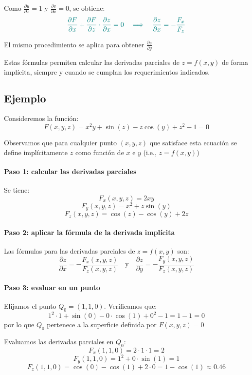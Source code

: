 \documentclass{article}
\begin{document}
Como \( \frac{\partial u}{\partial x} = 1 \) y \( \frac{\partial v}{\partial x} = 0 \), se obtiene:
\[
\color{teal}
\frac{\partial F}{\partial x} + \frac{\partial F}{\partial z} \cdot \frac{\partial z}{\partial x} = 0 \quad \Longrightarrow \quad \frac{\partial z}{\partial x} = -\frac{F_x}{F_z}
\]

El mismo procedimiento se aplica para obtener \( \frac{\partial z}{\partial y} \)

Estas fórmulas permiten calcular las derivadas parciales de \( z = f(x,y) \) de forma implícita, siempre y cuando se cumplan los requerimientos indicados.
\subsection*{Ejemplo}

Consideremos la función:
\[
F(x,y,z) = x^2y + \sin(z) - z\cos(y) + z^2 - 1 = 0
\]

Observamos que para cualquier punto \((x,y,z)\) que satisface esta ecuación se define implícitamente \( z \) como función de \( x \) e \( y \) (i.e., \( z = f(x,y) \))

\paragraph{\color{teal}Paso 1: calcular las derivadas parciales}  
Se tiene:
\[
F_x(x,y,z) = 2xy
\]
\[
F_y(x,y,z) = x^2 + z\sin(y)
\]
\[
F_z(x,y,z) = \cos(z) - \cos(y) + 2z
\]

\paragraph{\color{teal}Paso 2: aplicar la fórmula de la derivada implícita}  
Las fórmulas para las derivadas parciales de \( z = f(x,y) \) son:
\[
\frac{\partial z}{\partial x} = -\frac{F_x(x,y,z)}{F_z(x,y,z)} \quad \text{y} \quad \frac{\partial z}{\partial y} = -\frac{F_y(x,y,z)}{F_z(x,y,z)}
\]

\paragraph{\color{teal}Paso 3: evaluar en un punto}  
Elijamos el punto \( Q_0 = (1,1,0) \). Verificamos que:
\[
1^2 \cdot 1 + \sin(0) - 0 \cdot \cos(1) + 0^2 - 1 = 1 - 1 = 0
\]
por lo que \( Q_0 \) pertenece a la superficie definida por \( F(x,y,z) = 0 \)

Evaluamos las derivadas parciales en \( Q_0 \):
\[
F_x(1,1,0) = 2 \cdot 1 \cdot 1 = 2
\]
\[
F_y(1,1,0) = 1^2 + 0 \cdot \sin(1) = 1
\]
\[
F_z(1,1,0) = \cos(0) - \cos(1) + 2 \cdot 0 = 1 - \cos(1) \approx 0.46
\]
\end{document}
